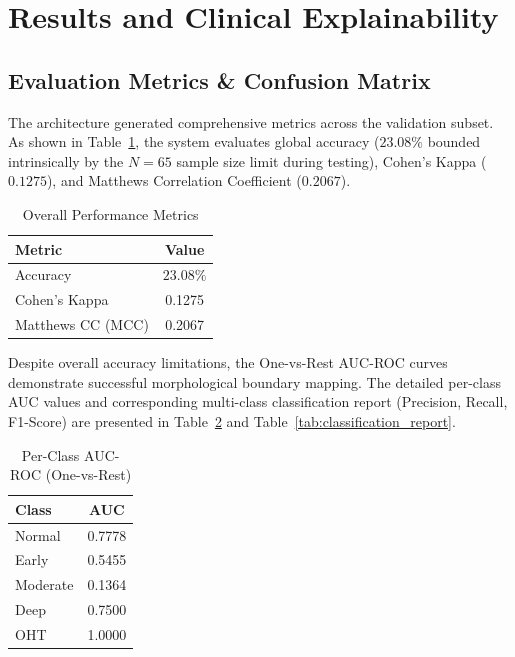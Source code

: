 \documentclass[a4paper,11pt]{article}
\begin{document}
\section{Results and Clinical Explainability}

\subsection{Evaluation Metrics \& Confusion Matrix}
The architecture generated comprehensive metrics across the validation subset. As shown in Table~\ref{tab:overall}, the system evaluates global accuracy ($23.08\%$ bounded intrinsically by the $N=65$ sample size limit during testing), Cohen's Kappa ($0.1275$), and Matthews Correlation Coefficient ($0.2067$). 

\begin{table}[H]
    \centering
    \caption{Overall Performance Metrics}
    \begin{tabular}{lc}
        \toprule
        \textbf{Metric} & \textbf{Value} \\
        \midrule
        Accuracy & $23.08\%$ \\
        Cohen's Kappa & 0.1275 \\
        Matthews CC (MCC) & 0.2067 \\
        \bottomrule
    \end{tabular}
    \label{tab:overall}
\end{table}

Despite overall accuracy limitations, the One-vs-Rest AUC-ROC curves demonstrate successful morphological boundary mapping. The detailed per-class AUC values and corresponding multi-class classification report (Precision, Recall, F1-Score) are presented in Table~\ref{tab:auc} and Table~\ref{tab:classification_report}.

\begin{table}[H]
    \centering
    \caption{Per-Class AUC-ROC (One-vs-Rest)}
    \begin{tabular}{lc}
        \toprule
        \textbf{Class} & \textbf{AUC} \\
        \midrule
        Normal & 0.7778 \\
        Early & 0.5455 \\
        Moderate & 0.1364 \\
        Deep & 0.7500 \\
        OHT & 1.0000 \\
        \bottomrule
    \end{tabular}
    \label{tab:auc}
\end{table}
\end{document}
